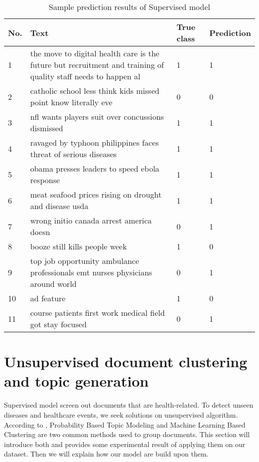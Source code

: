 \begin{table}[!htbp]
    \centering
    \hspace{0.5cm}
    \begin{tabular}{|p{15pt}|p{250pt}|p{60pt}|p{60pt}|}
        \hline
        No. & Text & True class & Prediction \\ \hline
        1 & the move to digital health care is the future but recruitment and training of quality staff needs to happen al & 1 & 1 \\\hline
        2 & catholic school less think kids missed point know literally eve & 0 & 0 \\\hline
        3 & nfl wants players suit over concussions dismissed & 1 & 1\\\hline
        4 & ravaged by typhoon philippines faces threat of serious diseases & 1 & 1 \\\hline
        5 & obama presses leaders to speed ebola response & 1 & 1 \\\hline
        6 & meat seafood prices rising on drought and disease usda & 1 & 1 \\\hline
        7 & wrong initio canada arrest america doesn & 0 & 1 \\\hline
        8 & booze still kills people week & 1 & 0 \\\hline
        9 & top job opportunity ambulance professionals emt nurses physicians around world & 0 & 1 \\\hline
        10 & ad feature & 1 & 0 \\\hline
        11 & course patients first work medical field got stay focused & 0 & 1 \\\hline
    \end{tabular}
    \caption{Sample prediction results of Supervised model}
    \label{tab:sup1}
\end{table}

\section{Unsupervised document clustering and topic generation}
\label{sec:unsupervised}
Supervised model screen out documents that are health-related. To detect unseen diseases and healthcare events, we seek solutions on unsupervised algorithm. According to \cite{allahyari2017brief}, Probability Based Topic Modeling and Machine Learning Based Clustering are two common methods used to group documents. This section will introduce both and provides some experimental result of applying them on our dataset. Then we will explain how our model are build upon them. 

